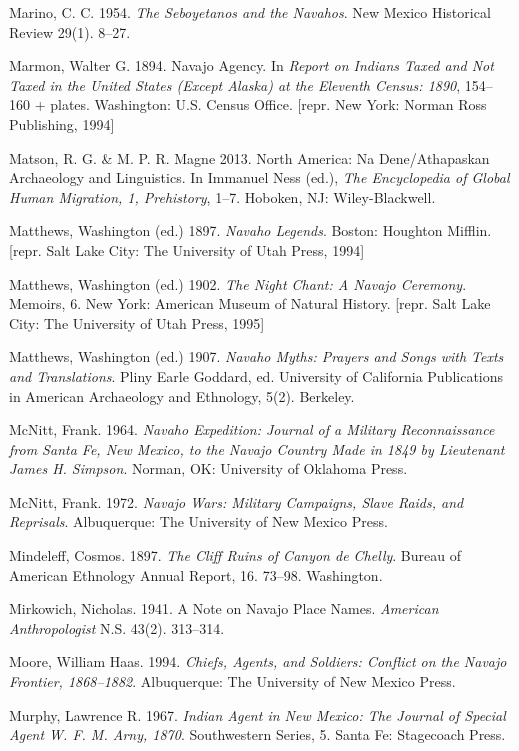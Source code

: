 Marino, C. C.  1954. \textit{The Seboyetanos and the Navahos}.  New Mexico Historical Review 29(1). 8--27.

Marmon, Walter G.  1894.  Navajo Agency.  In \textit{Report on Indians Taxed and Not Taxed in the United States (Except Alaska) at the Eleventh Census: 1890},   154--160 + plates.  Washington:  U.S. Census Office.  [repr. New York:  Norman Ross Publishing, 1994]

Matson, R. G. \& M. P. R. Magne  2013.  North America: Na Dene/Athapaskan Archaeology and Linguistics. In Immanuel Ness (ed.), \textit{The Encyclopedia of Global Human Migration, 1, Prehistory},  1--7.  Hoboken, NJ:  Wiley-Blackwell.

Matthews, Washington (ed.)  1897. \textit{Navaho Legends}.  Boston:  Houghton Mifflin.  [repr. Salt Lake City:  The University of Utah Press, 1994]


Matthews, Washington (ed.)  1902. \textit{The Night Chant: A Navajo Ceremony}.  Memoirs, 6.  New York:  American Museum of Natural History.  [repr. Salt Lake City:  The University of Utah Press, 1995]

Matthews, Washington (ed.)  1907. \textit{Navaho Myths: Prayers and Songs with Texts and Translations}.  Pliny Earle Goddard, ed.  University of California Publications in American Archaeology and Ethnology, 5(2).  Berkeley.

McNitt, Frank. 1964. \textit{Navaho Expedition: Journal of a Military Reconnaissance from Santa Fe, New Mexico, to the Navajo Country Made in 1849 by Lieutenant James H. Simpson}.  Norman, OK:  University of Oklahoma Press.

McNitt, Frank. 1972. \textit{Navajo Wars: Military Campaigns, Slave Raids, and Reprisals}.  Albuquerque:  The University of New Mexico Press.

Mindeleff, Cosmos. 1897. \textit{The Cliff Ruins of Canyon de Chelly}.  Bureau of American Ethnology Annual Report, 16. 73--98.  Washington.

Mirkowich, Nicholas. 1941.  A Note on Navajo Place Names.  \textit{American Anthropologist} N.S. 43(2). 313--314.

Moore, William Haas. 1994. \textit{Chiefs, Agents, and Soldiers: Conflict on the Navajo Frontier, 1868--1882}.  Albuquerque:  The University of New Mexico Press.

Murphy, Lawrence R.  1967. \textit{Indian Agent in New Mexico: The Journal of Special Agent W. F. M. Arny, 1870}.  Southwestern Series, 5.  Santa Fe:  Stagecoach Press.

